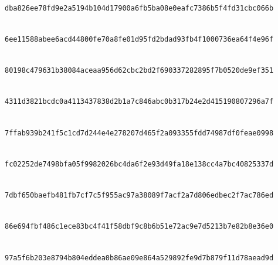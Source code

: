 \documentclass[pdflatex,sn-mathphys-num]{sn-jnl}%
\theoremstyle{thmstyleone}%
\theoremstyle{thmstyletwo}%
\theoremstyle{thmstylethree}%
\begin{document}
\begin{landscape}
\noindent{}\\
\texttt{dba826ee\allowbreak{}78fd9e2a\allowbreak{}5194b104\allowbreak{}d17900a6\allowbreak{}fb5ba08e\allowbreak{}0eafc738\allowbreak{}6b5f4fd3\allowbreak{}1cbc066b}\par
\noindent{}\\
\texttt{6ee11588\allowbreak{}abee6acd\allowbreak{}44800fe7\allowbreak{}0a8fe01d\allowbreak{}95fd2bda\allowbreak{}d93fb4f1\allowbreak{}000736ea\allowbreak{}64f4e96f}\par
\noindent{}\\
\texttt{80198c47\allowbreak{}9631b380\allowbreak{}84aceaa9\allowbreak{}56d62cbc\allowbreak{}2bd2f690\allowbreak{}33728289\allowbreak{}5f7b0520\allowbreak{}de9ef351}\par
\noindent{}\\
\texttt{4311d382\allowbreak{}1bcdc0a4\allowbreak{}11343783\allowbreak{}8d2b1a7c\allowbreak{}846abc0b\allowbreak{}317b24e2\allowbreak{}d4151908\allowbreak{}07296a7f}\par
\noindent{}\\
\texttt{7ffab939\allowbreak{}b241f5c1\allowbreak{}cd7d244e\allowbreak{}4e278207\allowbreak{}d465f2a0\allowbreak{}93355fdd\allowbreak{}74987df0\allowbreak{}feae0998}\par
\noindent{}\\
\texttt{fc02252d\allowbreak{}e7498bfa\allowbreak{}05f99820\allowbreak{}26bc4da6\allowbreak{}f2e93d49\allowbreak{}fa18e138\allowbreak{}cc4a7bc4\allowbreak{}0825337d}\par
\noindent{}\\
\texttt{7dbf650b\allowbreak{}aefb481f\allowbreak{}b7cf7c5f\allowbreak{}955ac97a\allowbreak{}38089f7a\allowbreak{}cf2a7d80\allowbreak{}6edbec2f\allowbreak{}7ac786ed}\par
\noindent{}\\
\texttt{86e694fb\allowbreak{}f486c1ec\allowbreak{}e83bc4f4\allowbreak{}1f58dbf9\allowbreak{}c8b6b51e\allowbreak{}72ac9e7d\allowbreak{}5213b7e8\allowbreak{}2b8e36e0}\par
\noindent{}\\
\texttt{97a5f6b2\allowbreak{}03e8794b\allowbreak{}804eddea\allowbreak{}0b86ae09\allowbreak{}e864a529\allowbreak{}892fe9d7\allowbreak{}b879f11d\allowbreak{}78aead9d}\par

\end{landscape}
\end{document}
